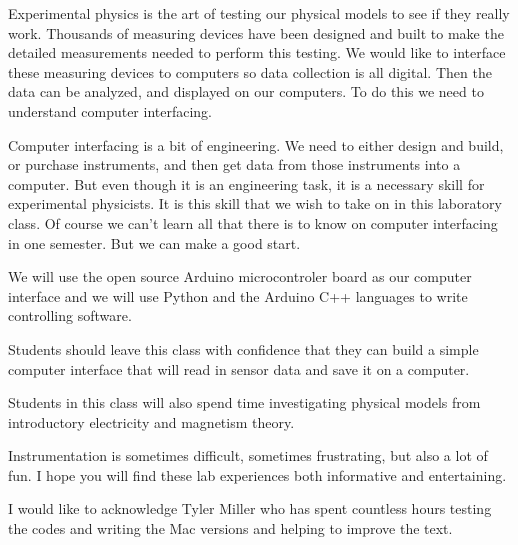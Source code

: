 Experimental physics is the art of testing our physical models to see if they really work. Thousands of measuring devices have been designed and built to make the detailed measurements needed to perform this testing. We would like to interface these measuring devices to computers so data collection is all digital. Then the data can be analyzed, and displayed on our computers. To do this we need to understand computer interfacing.

Computer interfacing is a bit of engineering. We need to either design and build, or purchase instruments, and then get data from those instruments into a computer. But even though it is an engineering task, it is a necessary skill for experimental physicists. It is this skill that we wish to take on in this laboratory class. Of course we can't learn all that there is to know on computer interfacing in one semester. But we can make a good start.

We will use the open source Arduino microcontroler board as our computer interface and we will use Python and the Arduino C++ languages to write controlling software.

Students should leave this class with confidence that they can build a simple computer interface that will read in sensor data and save it on a computer.

Students in this class will also spend time investigating physical models from introductory electricity and magnetism theory.

Instrumentation is sometimes difficult, sometimes frustrating, but also a lot of fun. I hope you will find these lab experiences both informative and entertaining. 

I would like to acknowledge Tyler Miller who has spent countless hours testing the codes and writing the Mac versions and helping to improve the text. 
